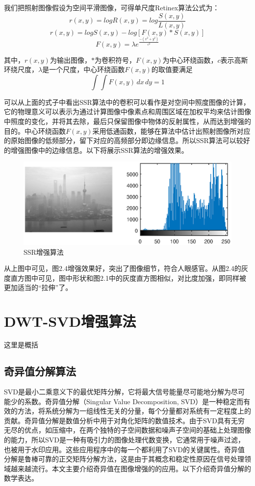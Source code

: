 \documentclass[12pt]{book}
\begin{document}
我们把照射图像假设为空间平滑图像，可得单尺度Retinex算法公式为：
\begin{equation}     r(x,y)=logR(x,y)=log \frac{S(x,y)}{L(x,y)}    \end{equation}
\begin{equation}     r(x,y)=logS(x,y)-log \left[ F(x,y)*S(x,y) \right]    \end{equation}	
\begin{equation}     F(x,y)=\lambda e^{\frac{-(x^2+y^2)}{c^2}}    \end{equation}	

其中，$r(x,y)$为输出图像，$*$为卷积符号，$F(x,y)$为中心环绕函数，$c$表示高斯环绕尺度，$\lambda$是一个尺度，中心环绕函数$F(x,y)$的取值要满足
\begin{equation}     \int\int F(x,y)\,dx \,dy=1    \end{equation}

可以从上面的式子中看出SSR算法中的卷积可以看作是对空间中照度图像的计算，它的物理意义可以表示为通过计算图像中像素点和周围区域在加权平均来估计图像中照度的变化，并将其去除，最后只保留图像中物体的反射属性，从而达到增强的目的。中心环绕函数$F(x,y)$采用低通函数，能够在算法中估计出照射图像所对应的原始图像的低频部分，留下对应的高频部分即边缘信息。所以SSR算法可以较好的增强图像中的边缘信息。以下将展示SSR算法的增强效果。
			\begin{figure}[!ht]\centering
				\includegraphics[totalheight=60mm]{./figures/ssr2.eps}
				\caption{SSR增强算法\label{SSR}}
			\end{figure}

从上图中可见，图2.4增强效果好，突出了图像细节，符合人眼感官。从图2.4的灰度直方图中可见，图中形状和图2.1中的灰度直方图相似，对比度加强，即同样被更加适当的“拉伸”了。
	\chapter{DWT-SVD增强算法}这里是概括
		\section{奇异值分解算法}SVD是最小二乘意义下的最优矩阵分解，它将最大信号能量尽可能地分解为尽可能少的系数。奇异值分解（Singular Value Decomposition, SVD）是一种稳定而有效的方法，将系统分解为一组线性无关的分量，每个分量都对系统有一定程度上的贡献。奇异值分解是数值分析中用于对角化矩阵的数值技术。由于SVD具有无穷无尽的优点，如压缩中，在两个独特的子空间数据和噪声子空间的基础上处理图像的能力，所以SVD是一种有吸引力的图像处理代数变换，它通常用于噪声过滤，也被用于水印应用。这些应用程序中的每一个都利用了SVD的关键属性。奇异值分解是鲁棒可靠的正交矩阵分解方法，这是由于其概念和稳定性原因在信号处理领域越来越流行。本文主要介绍奇异值在图像增强的的应用。以下介绍奇异值分解的数学表达。
\end{document}
